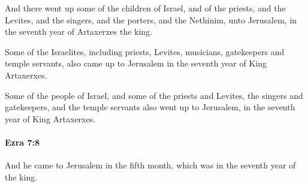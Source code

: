 			\begin{versebox}
					\item[BHS] 
					\item[LXX] 
					\item[ASV] And there went up some of the children of Israel, and of the priests, and the Levites, and the singers, and the porters, and the Nethinim, unto Jerusalem, in the seventh year of Artaxerxes the king.
					\item[NIV] Some of the Israelites, including priests, Levites, musicians, gatekeepers and temple servants, also came up to Jerusalem in the seventh year of King Artaxerxes.
					\item[NRSV] Some of the people of Israel, and some of the priests and Levites, the singers and gatekeepers, and the temple servants also went up to Jerusalem, in the seventh year of King Artaxerxes.
			\end{versebox}

		\paragraph{Ezra 7:8} %
			\label{EZRA-7-8}

			And he came to Jerusalem in the fifth month, which was in the seventh year of the king.

